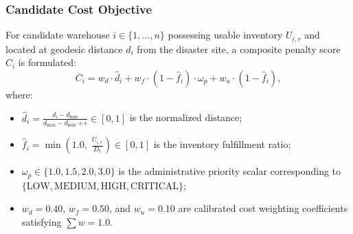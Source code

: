 \documentclass[conference]{IEEEtran}
\begin{document}
\subsubsection{Candidate Cost Objective}
For candidate warehouse $i \in \{1, \dots, n\}$ possessing usable inventory $U_{i,r}$ and located at geodesic distance $d_i$ from the disaster site, a composite penalty score $C_i$ is formulated:
\begin{equation}
C_i = w_d \cdot \hat{d}_i + w_f \cdot (1 - \hat{f}_i) \cdot \omega_p + w_u \cdot (1 - \hat{f}_i),
\label{eq:qaoa_cost}
\end{equation}
where:
\begin{itemize}
    \item $\hat{d}_i = \frac{d_i - d_{\min}}{d_{\max} - d_{\min} + \epsilon} \in [0, 1]$ is the normalized distance;
    \item $\hat{f}_i = \min\left(1.0, \; \frac{U_{i,r}}{D_r}\right) \in [0, 1]$ is the inventory fulfillment ratio;
    \item $\omega_p \in \{1.0, 1.5, 2.0, 3.0\}$ is the administrative priority scalar corresponding to $\{\text{LOW}, \text{MEDIUM}, \text{HIGH}, \text{CRITICAL}\}$;
    \item $w_d = 0.40$, $w_f = 0.50$, and $w_u = 0.10$ are calibrated cost weighting coefficients satisfying $\sum w = 1.0$.
\end{itemize}
\end{document}
